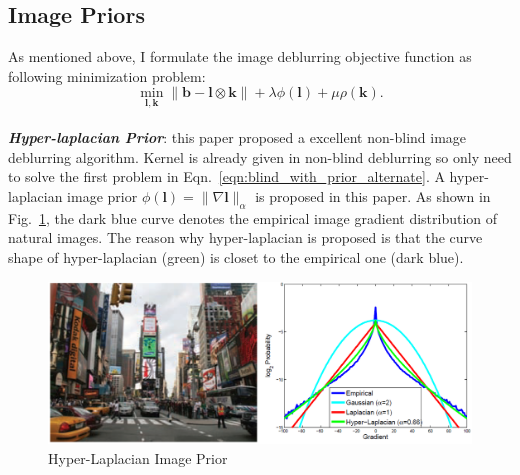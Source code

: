 \documentclass[journal, onecolumn, 10pt]{IEEEtran}
\begin{document}
\subsection{Image Priors}
\label{subsec:image_prior}
As mentioned above, I formulate the image deblurring objective function as following minimization problem:
\begin{equation}
\min_{\mathbf{l}, \mathbf{k}} \| \mathbf{b} - \mathbf{l} \otimes \mathbf{k} \| + \lambda\phi(\mathbf{l}) + \mu \rho(\mathbf{k}).
\label{eqn:objective_funtion}
\end{equation}
~\\
\textbf{\emph{Hyper-laplacian Prior}}\cite{krishnan2009fast}: this paper proposed a excellent non-blind image deblurring algorithm. Kernel is already given in non-blind deblurring so only need to solve the first problem in Eqn.~\ref{eqn:blind_with_prior_alternate}. A hyper-laplacian image prior $\phi(\mathbf{l}) = \|\nabla \mathbf{l}\|_{\alpha}$ is proposed in this paper. As shown in Fig.~\ref{fig:hyper_laplacian}, the dark blue curve denotes the empirical image gradient distribution of natural images. The reason why hyper-laplacian is proposed is that the curve shape of  hyper-laplacian (green) is closet to the empirical one (dark blue). 
\begin{figure}[h!]
\centering
\includegraphics[width = 1\textwidth]{pic/hyper_laplacian.png}
\caption{Hyper-Laplacian Image Prior\cite{su2016deep}}
\label{fig:hyper_laplacian}
\end{figure}
\end{document}
